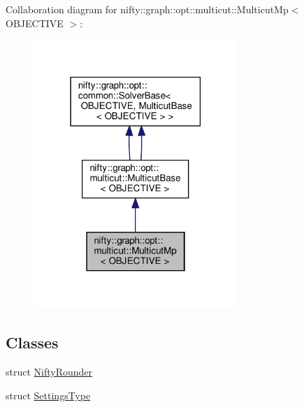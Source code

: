 Collaboration diagram for nifty\+:\+:graph\+:\+:opt\+:\+:multicut\+:\+:Multicut\+Mp$<$ O\+B\+J\+E\+C\+T\+I\+VE $>$\+:
\nopagebreak
\begin{figure}[H]
\begin{center}
\leavevmode
\includegraphics[width=219pt]{classnifty_1_1graph_1_1opt_1_1multicut_1_1MulticutMp__coll__graph}
\end{center}
\end{figure}
\subsection*{Classes}
\begin{DoxyCompactItemize}
\item 
struct \hyperlink{structnifty_1_1graph_1_1opt_1_1multicut_1_1MulticutMp_1_1NiftyRounder}{Nifty\+Rounder}
\item 
struct \hyperlink{structnifty_1_1graph_1_1opt_1_1multicut_1_1MulticutMp_1_1SettingsType}{Settings\+Type}
\end{DoxyCompactItemize}
